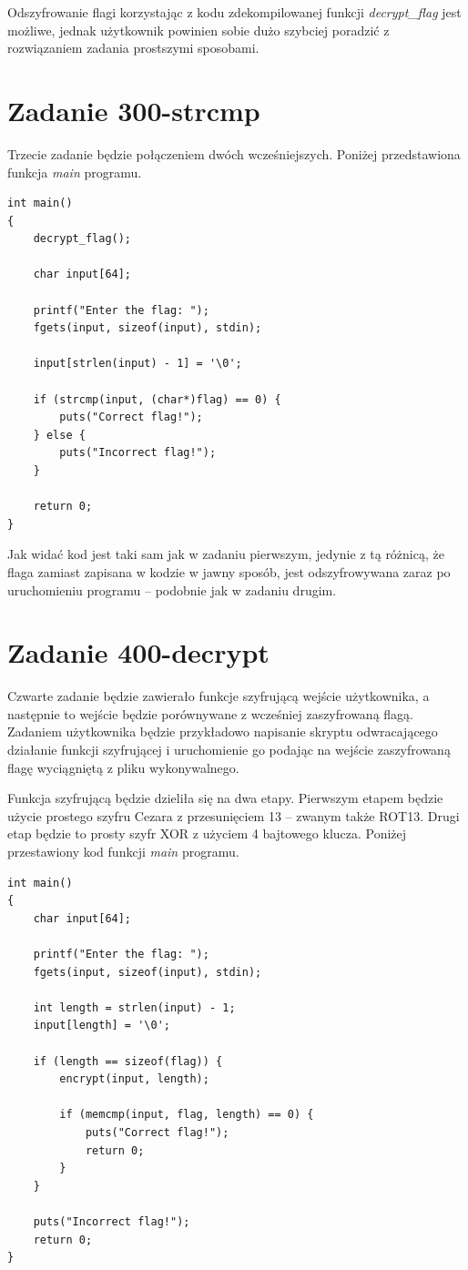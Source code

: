 \documentclass[language=polish,type=eng]{aghmodern}
\begin{document}
Odszyfrowanie flagi korzystając z kodu zdekompilowanej funkcji \emph{decrypt\_flag} jest możliwe,
jednak użytkownik powinien sobie dużo szybciej poradzić z rozwiązaniem zadania prostszymi
sposobami.

\section{Zadanie 300-strcmp}

Trzecie zadanie będzie połączeniem dwóch wcześniejszych.
Poniżej przedstawiona funkcja \emph{main} programu.

\begin{verbatim}
int main()
{
    decrypt_flag();

    char input[64];

    printf("Enter the flag: ");
    fgets(input, sizeof(input), stdin);

    input[strlen(input) - 1] = '\0';

    if (strcmp(input, (char*)flag) == 0) {
        puts("Correct flag!");
    } else {
        puts("Incorrect flag!");
    }

    return 0;
}
\end{verbatim}

Jak widać kod jest taki sam jak w zadaniu pierwszym, jedynie z tą różnicą, że
flaga zamiast zapisana w kodzie w jawny sposób, jest odszyfrowywana zaraz po uruchomieniu
programu -- podobnie jak w zadaniu drugim.

\section{Zadanie 400-decrypt}

Czwarte zadanie będzie zawierało funkcje szyfrującą wejście użytkownika, a następnie to wejście będzie
porównywane z wcześniej zaszyfrowaną flagą. Zadaniem użytkownika będzie przykładowo napisanie skryptu
odwracającego działanie funkcji szyfrującej i uruchomienie go podając na wejście zaszyfrowaną flagę
wyciągniętą z pliku wykonywalnego.

Funkcja szyfrującą będzie dzieliła się na dwa etapy. Pierwszym etapem będzie użycie prostego
szyfru Cezara z przesunięciem 13 -- zwanym także ROT13. Drugi etap będzie to prosty szyfr XOR
z użyciem 4 bajtowego klucza. Poniżej przestawiony kod funkcji \emph{main} programu.

\begin{verbatim}
int main()
{
    char input[64];

    printf("Enter the flag: ");
    fgets(input, sizeof(input), stdin);

    int length = strlen(input) - 1;
    input[length] = '\0';

    if (length == sizeof(flag)) {
        encrypt(input, length);

        if (memcmp(input, flag, length) == 0) {
            puts("Correct flag!");
            return 0;
        }
    }

    puts("Incorrect flag!");
    return 0;
}
\end{verbatim}
\end{document}

